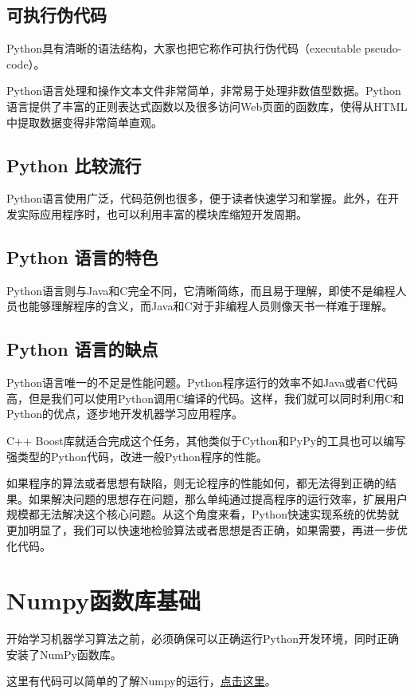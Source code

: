 \subsection{可执行伪代码}
Python具有清晰的语法结构，大家也把它称作可执行伪代码（executable pseudo-code）。

Python语言处理和操作文本文件非常简单，非常易于处理非数值型数据。Python语言提供了丰富的正则表达式函数以及很多访问Web页面的函数库，使得从HTML中提取数据变得非常简单直观。

\subsection{Python 比较流行}
Python语言使用广泛，代码范例也很多，便于读者快速学习和掌握。此外，在开发实际应用程序时，也可以利用丰富的模块库缩短开发周期。

\subsection{Python 语言的特色}
Python语言则与Java和C完全不同，它清晰简练，而且易于理解，即使不是编程人员也能够理解程序的含义，而Java和C对于非编程人员则像天书一样难于理解。

\subsection{Python 语言的缺点}
Python语言唯一的不足是性能问题。Python程序运行的效率不如Java或者C代码高，但是我们可以使用Python调用C编译的代码。这样，我们就可以同时利用C和Python的优点，逐步地开发机器学习应用程序。

C++ Boost库就适合完成这个任务，其他类似于Cython和PyPy的工具也可以编写强类型的Python代码，改进一般Python程序的性能。

如果程序的算法或者思想有缺陷，则无论程序的性能如何，都无法得到正确的结果。如果解决问题的思想存在问题，那么单纯通过提高程序的运行效率，扩展用户规模都无法解决这个核心问题。从这个角度来看，Python快速实现系统的优势就更加明显了，我们可以快速地检验算法或者思想是否正确，如果需要，再进一步优化代码。
\section{Numpy函数库基础}
开始学习机器学习算法之前，必须确保可以正确运行Python开发环境，同时正确安装了NumPy函数库。



这里有代码可以简单的了解Numpy的运行，\href{https://github.com/JPL-JUNO/Machine-Learning-in-Action/blob/main/Codes/Ch01.ipynb}{点击这里}。

